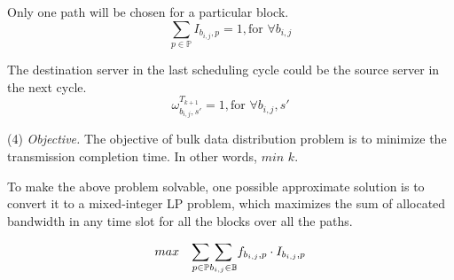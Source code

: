 \begin{packeditemize}
\item Only one path will be chosen for a particular block.
\begin{equation}
\displaystyle{\sum_{p \in \mathbb{P}}} I_{b_{i,j},p} = 1, \text{for }\forall b_{i,j}
\end{equation}


\item The destination server in the last scheduling cycle could be the source server in the next cycle.
\begin{equation}
\omega^{T_{k+1}}_{b_{i,j},s'} = 1, \text{for }\forall b_{i,j}, s'
\end{equation}
\end{packeditemize}


\noindent(4) {\em Objective.} The objective of bulk data distribution problem is to minimize the transmission completion time. In other words, $min$ $k$.

 To make the above problem solvable, one possible approximate solution is to convert it to a mixed-integer LP problem, which maximizes the sum of allocated bandwidth in any time slot for all the blocks over all the paths.

\begin{equation}
\centering
max \quad \displaystyle{\sum_{p\in \mathbb{P}}} \displaystyle{\sum_{b_{i,j} \in \mathbb{B}}} f_{b_{i,j},p} \cdot I_{b_{i,j},p}
\label{equation:objective}
\end{equation}


